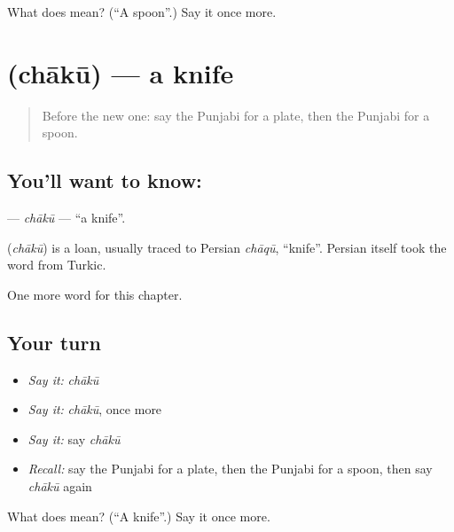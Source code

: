 \begin{tcolorbox}[breakable,colback=teal!4,colframe=teal!35!black,title={Before you move on}]
What does  mean? (\textquotedblleft{}A spoon\textquotedblright{}.) Say it once more.
\end{tcolorbox}
\section[\texorpdfstring{\pa{ਚਾਕੂ} (chākū)}{ਚਾਕੂ (chākū)}]{ (chākū) — a knife}

\label{lesson:PA-C70-chaku}



\begin{quote}
Before the new one: say the Punjabi for a plate, then the Punjabi for a spoon.
\end{quote}

\subsection*{You'll want to know: }
\textbf{} — \emph{chākū} — \textquotedblleft{}a knife\textquotedblright{}.

\begin{cousinweb}
\textbf{} (\emph{chākū}) is a loan, usually traced to Persian \emph{chāqū}, \textquotedblleft{}knife\textquotedblright{}. Persian itself took the word from Turkic.
\end{cousinweb}

\begin{grammarlens}[title={What you've built}]
One more word for this chapter.
\end{grammarlens}

\subsection*{Your turn}
\begin{itemize}
\raggedright
  \item \emph{Say it:} \emph{chākū}
  \item \emph{Say it:} \emph{chākū}, once more
  \item \emph{Say it:} say \emph{chākū}
  \item \emph{Recall:} say the Punjabi for a plate, then the Punjabi for a spoon, then say \emph{chākū} again
\end{itemize}

\begin{tcolorbox}[breakable,colback=teal!4,colframe=teal!35!black,title={Before you move on}]
What does  mean? (\textquotedblleft{}A knife\textquotedblright{}.) Say it once more.
\end{tcolorbox}
